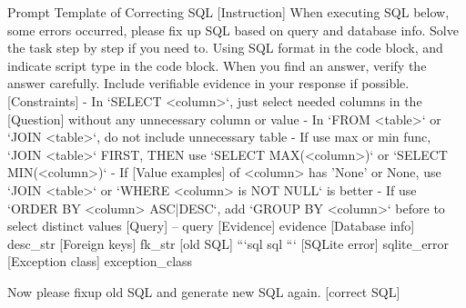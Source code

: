 \clearpage
\begin{myverbatim}{Prompt Template of Correcting SQL}
[Instruction]
When executing SQL below, some errors occurred, please fix up SQL based on query and database info.
Solve the task step by step if you need to. Using SQL format in the code block, and indicate script type in the code block.
When you find an answer, verify the answer carefully. Include verifiable evidence in your response if possible.
[Constraints]
- In `SELECT <column>`, just select needed columns in the [Question] without any unnecessary column or value
- In `FROM <table>` or `JOIN <table>`, do not include unnecessary table
- If use max or min func, `JOIN <table>` FIRST, THEN use `SELECT MAX(<column>)` or `SELECT MIN(<column>)`
- If [Value examples] of <column> has 'None' or None, use `JOIN <table>` or `WHERE <column> is NOT NULL` is better
- If use `ORDER BY <column> ASC|DESC`, add `GROUP BY <column>` before to select distinct values
[Query]
-- {query}
[Evidence]
{evidence}
[Database info]
{desc_str}
[Foreign keys]
{fk_str}
[old SQL]
```sql
{sql}
```
[SQLite error] 
{sqlite_error}
[Exception class]
{exception_class}

Now please fixup old SQL and generate new SQL again.
[correct SQL]
\end{myverbatim}